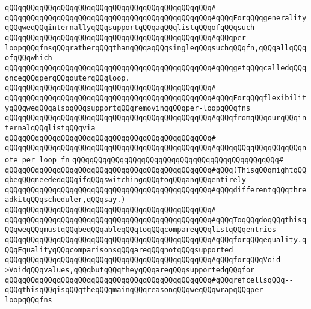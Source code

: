 \verb|qQQqqQQqqQQqqQQqqQQqqQQqqQQqqQQqqQQqqQQqqQQqqQQq#|\newline
\verb|qQQqqQQqqQQqqQQqqQQqqQQqqQQqqQQqqQQqqQQqqQQqqQQq#qQQqForqQQqgeneralityqQQqweqQQqinternallyqQQqsupportqQQqaqQQqlistqQQqofqQQqsuch|\newline
\verb|qQQqqQQqqQQqqQQqqQQqqQQqqQQqqQQqqQQqqQQqqQQqqQQq#qQQqper-loopqQQqfnsqQQqratherqQQqthanqQQqaqQQqsingleqQQqsuchqQQqfn,qQQqallqQQqofqQQqwhich|\newline
\verb|qQQqqQQqqQQqqQQqqQQqqQQqqQQqqQQqqQQqqQQqqQQqqQQq#qQQqgetqQQqcalledqQQqonceqQQqperqQQqouterqQQqloop.|\newline
\verb|qQQqqQQqqQQqqQQqqQQqqQQqqQQqqQQqqQQqqQQqqQQqqQQq#|\newline
\verb|qQQqqQQqqQQqqQQqqQQqqQQqqQQqqQQqqQQqqQQqqQQqqQQq#qQQqForqQQqflexibilityqQQqweqQQqalsoqQQqsupportqQQqremovingqQQqper-loopqQQqfns|\newline
\verb|qQQqqQQqqQQqqQQqqQQqqQQqqQQqqQQqqQQqqQQqqQQqqQQq#qQQqfromqQQqourqQQqinternalqQQqlistqQQqvia|\newline
\verb|qQQqqQQqqQQqqQQqqQQqqQQqqQQqqQQqqQQqqQQqqQQqqQQq#|\newline
\verb|qQQqqQQqqQQqqQQqqQQqqQQqqQQqqQQqqQQqqQQqqQQqqQQq#qQQqqQQqqQQqqQQqqQQqnote_per_loop_fn|\newline
\verb|qQQqqQQqqQQqqQQqqQQqqQQqqQQqqQQqqQQqqQQqqQQqqQQq#|\newline
\verb|qQQqqQQqqQQqqQQqqQQqqQQqqQQqqQQqqQQqqQQqqQQqqQQq#qQQq(ThisqQQqmightqQQqbeqQQqneededqQQqifqQQqswitchingqQQqtoqQQqanqQQqentirely|\newline
\verb|qQQqqQQqqQQqqQQqqQQqqQQqqQQqqQQqqQQqqQQqqQQqqQQq#qQQqdifferentqQQqthreadkitqQQqscheduler,qQQqsay.)|\newline
\verb|qQQqqQQqqQQqqQQqqQQqqQQqqQQqqQQqqQQqqQQqqQQqqQQq#|\newline
\verb|qQQqqQQqqQQqqQQqqQQqqQQqqQQqqQQqqQQqqQQqqQQqqQQq#qQQqToqQQqdoqQQqthisqQQqweqQQqmustqQQqbeqQQqableqQQqtoqQQqcompareqQQqlistqQQqentries|\newline
\verb|qQQqqQQqqQQqqQQqqQQqqQQqqQQqqQQqqQQqqQQqqQQqqQQq#qQQqforqQQqequality.qQQqEqualityqQQqcomparisonsqQQqareqQQqnotqQQqsupported|\newline
\verb|qQQqqQQqqQQqqQQqqQQqqQQqqQQqqQQqqQQqqQQqqQQqqQQq#qQQqforqQQqVoid->VoidqQQqvalues,qQQqbutqQQqtheyqQQqareqQQqsupportedqQQqfor|\newline
\verb|qQQqqQQqqQQqqQQqqQQqqQQqqQQqqQQqqQQqqQQqqQQqqQQq#qQQqrefcellsqQQq--qQQqthisqQQqisqQQqtheqQQqmainqQQqreasonqQQqweqQQqwrapqQQqper-loopqQQqfns|\newline
